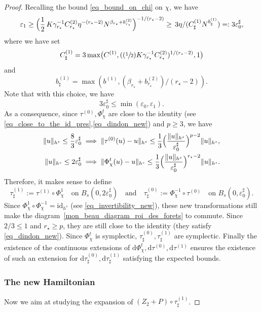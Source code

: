 \documentclass[JEP,XML,SOM,Unicode,NoEqCountersInSection,published]{cedram}
\newcommand{\Psfrac}[2]{(\sfrac{#1}{#2})}
\theoremstyle{definition}
\begin{document}
\begin{proof}
Recalling the bound \eqref{eq_bound_on_chi} on $\chi$, we have
\[
\varepsilon_1 \geq \Bigl(\frac12\, K \gamma_{r_\star}^{-1} C_{r_\star}^{(2)} \eta^{-(r_\star-2)} N^{\beta_{r_\star}+ b_{r_\star}^{(2)}}\Bigr)^{-1/(r_{\star}-2)} \geq \, 3 \eta /(C^{(1)}_\sharp N^{b^{(1)}_\sharp})=: 3 \varepsilon_0^\sharp,
\]
where we have set
\[
C^{(1)}_\sharp = 3 \max\bigl(C^{(1)}, (\Psfrac12 K \gamma_{r_\star}^{-1} C_{r_\star}^{(2)})^{1/(r_\star-2)},1\bigr)
\]
and
\[
b^{(1)}_{\sharp}=\max(b^{(1)},(\beta_{r_\star}+ b_{r_\star}^{(2)})/(r_{\star}-2)).
\]
Note that with this choice, we have
\[
3 \varepsilon_0^\sharp \leq \min(\varepsilon_0,\varepsilon_1).
\]
As a consequence, since $\tau^{(0)},\Phi_\chi^t$ are close to the identity (see \eqref{eq_close_to_the_id_pres},\eqref{eq_dindon_new}) and $p\geq 3$, we have
\begin{align*}
\| u \|_{h^s} \leq \frac83 \varepsilon_0^\sharp &\implies \|\tau^{(0)}(u)-u\|_{h^s} \leq \frac13 \Bigl(\frac{\|u\|_{h^s}}{\varepsilon_0^\sharp} \Bigr)^{p-2} \|u\|_{h^s},\\
\| u \|_{h^s} \leq 2 \varepsilon_0^\sharp &\implies \|\Phi_\chi^t(u)-u\|_{h^s} \leq \frac13 \Bigl(\frac{\|u\|_{h^s}}{\varepsilon_0^\sharp} \Bigr)^{r_\star-2} \|u\|_{h^s}.
\end{align*}
Therefore, it makes sense to define
\[
\tau^{(1)}_\sharp:= \tau^{(1)} \circ \Phi_\chi^1\quad \text{on } B_s(0,2 \varepsilon_0^\sharp)\quad \text{and} \quad \tau^{(0)}_\sharp:= \Phi_\chi^{-1}\circ \tau^{(0)}\quad \text{on } B_s(0, \varepsilon_0^\sharp).
\]
Since $\Phi_\chi^{1} \circ \Phi_\chi^{-1} =\mathrm{id}_{h^s}$ (see \eqref{eq_invertibility_new}), these new transformations still make the diagram~\eqref{mon_beau_diagram_roi_des_forets} to commute. Since $2/3\leq 1$ and $r_\star \geq p$, they are still close to the identity (\ie they satisfy \eqref{eq_dindon_new}). Since $\Phi_\chi^t$ is symplectic, $\tau^{(0)}_\sharp,\tau^{(1)}_\sharp$ are symplectic. Finally the existence of the continuous extensions of $\mathrm{d}\Phi_\chi^t,\mathrm{d} \tau^{(0)}, \mathrm{d} \tau^{(1)}$ ensures the existence of such an extension for $\mathrm{d}\tau^{(0)}_\sharp,\mathrm{d}\tau^{(1)}_\sharp$ satisfying the expected bounds.

\subsubsection*{The new Hamiltonian}
Now we aim at studying the expansion of $(Z_2+P)\circ \tau^{(1)}_\sharp$.


\end{proof}
\end{document}
